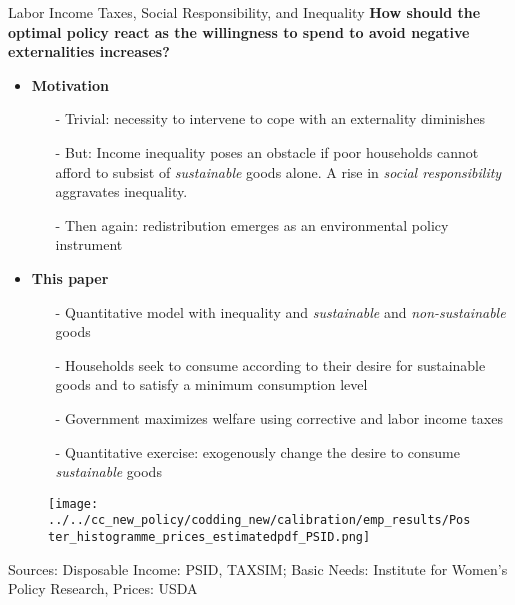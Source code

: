 \begin{frame}{Labor Income Taxes, Social Responsibility, and Inequality}
\footnotesize
	\alert{\textbf{How should the optimal policy react as the willingness to spend to avoid negative externalities increases?}}
	\pause
	\begin{itemize}[<+->]
		\item \textbf{Motivation}
		{\footnotesize
		\begin{itemize}			
			\item[-] Trivial: necessity to intervene to cope with an externality diminishes
			\item[-] But: Income inequality poses an obstacle if poor households cannot afford to subsist of \textit{sustainable} goods alone. A rise in \textit{social responsibility} aggravates inequality. 
			\item[-] Then again: redistribution emerges as an environmental policy instrument
		\end{itemize}}
	\vspace{2mm}
	\item \textbf{This paper}
	\begin{itemize}
\item[-] Quantitative model with inequality and  \textit{sustainable} and \textit{non-sustainable} goods
\item[-] Households seek to consume according to their desire for sustainable goods and to satisfy a minimum consumption level
\item[-] Government maximizes welfare using corrective and labor income taxes
\item[-] Quantitative exercise: exogenously change the desire to consume \textit{sustainable} goods
	\end{itemize}
	\end{itemize}
\end{frame}

\begin{frame}{}
\vspace{4mm}
\begin{minipage}[]{1\textwidth}
	\begin{figure}
		\texttt{[image: ../../cc\_new\_policy/codding\_new/calibration/emp\_results/Poster\_histogramme\_prices\_estimatedpdf\_PSID.png]}	
	\end{figure}
	\centering
	\tiny{Sources: Disposable Income: PSID, TAXSIM; Basic Needs: Institute for Women's Policy Research, Prices: USDA}
\end{minipage}\end{frame}


